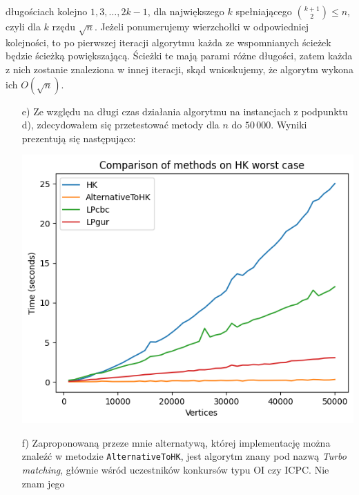 \documentclass[12pt]{article}
\begin{document}
\begin{itemize}
                  długościach kolejno \(1, 3, \ldots, 2k - 1\), dla największego
                  \(k\) spełniającego \(\binom{k + 1}{2} \leqslant n\), czyli
                  dla \(k\) rzędu \(\sqrt{n}\). Jeżeli ponumerujemy wierzchołki
                  w odpowiedniej kolejności, to po pierwszej iteracji algorytmu
                  każda ze wspomnianych ścieżek będzie ścieżką powiększającą.
                  Ścieżki te mają parami różne długości, zatem każda z nich
                  zostanie znaleziona w innej iteracji, skąd wnioskujemy, że
                  algorytm wykona ich \(O \left( \sqrt{n} \right)\).
    \end{itemize}
    
    \newpage
    
    \begin{itemize}
        \item[e)] Ze względu na długi czas działania algorytmu na instancjach z
                  podpunktu d), zdecydowałem się przetestować metody dla \(n\)
                  do \(50\,000\). Wyniki prezentują się następująco:
                  \begin{center}
                      \includegraphics[scale = 0.8]{image_02.png}
                  \end{center}
        \item[f)] Zaproponowaną przeze mnie alternatywą, której implementację
                  można znaleźć w metodzie \texttt{AlternativeToHK}, jest
                  algorytm znany pod nazwą \textit{Turbo matching}, głównie
                  wśród uczestników konkursów typu OI czy ICPC. Nie znam jego

\end{itemize}
\end{document}
